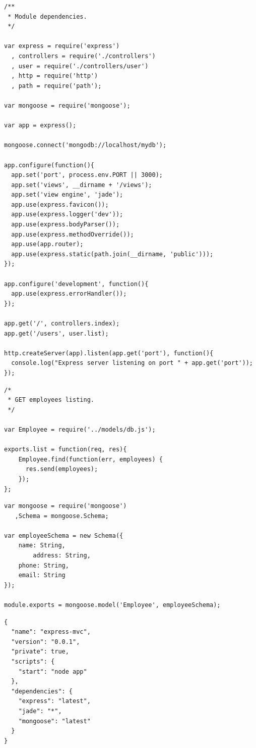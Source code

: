\lstset{language=JavaScript,caption=app.js}
\begin{lstlisting}
/**
 * Module dependencies.
 */

var express = require('express')
  , controllers = require('./controllers')
  , user = require('./controllers/user')
  , http = require('http')
  , path = require('path');

var mongoose = require('mongoose');

var app = express();

mongoose.connect('mongodb://localhost/mydb');

app.configure(function(){
  app.set('port', process.env.PORT || 3000);
  app.set('views', __dirname + '/views');
  app.set('view engine', 'jade');
  app.use(express.favicon());
  app.use(express.logger('dev'));
  app.use(express.bodyParser());
  app.use(express.methodOverride());
  app.use(app.router);
  app.use(express.static(path.join(__dirname, 'public')));
});

app.configure('development', function(){
  app.use(express.errorHandler());
});

app.get('/', controllers.index);
app.get('/users', user.list);

http.createServer(app).listen(app.get('port'), function(){
  console.log("Express server listening on port " + app.get('port'));
});
\end{lstlisting}

\lstset{language=JavaScript,caption=controllers/user.js}
\begin{lstlisting}
/*
 * GET employees listing.
 */

var Employee = require('../models/db.js');

exports.list = function(req, res){
	Employee.find(function(err, employees) {
	  res.send(employees);
	});
};
\end{lstlisting}

\lstset{language=JavaScript,caption=models/db.js}
\begin{lstlisting}
var mongoose = require('mongoose')
   ,Schema = mongoose.Schema;
 
var employeeSchema = new Schema({
    name: String,
		address: String,
    phone: String,
    email: String
});
 
module.exports = mongoose.model('Employee', employeeSchema);
\end{lstlisting}


\lstset{language=JavaScript,caption=package.json}
\begin{lstlisting}
{
  "name": "express-mvc",
  "version": "0.0.1",
  "private": true,
  "scripts": {
    "start": "node app"
  },
  "dependencies": {
    "express": "latest",
    "jade": "*",
    "mongoose": "latest"
  }
}
\end{lstlisting}

